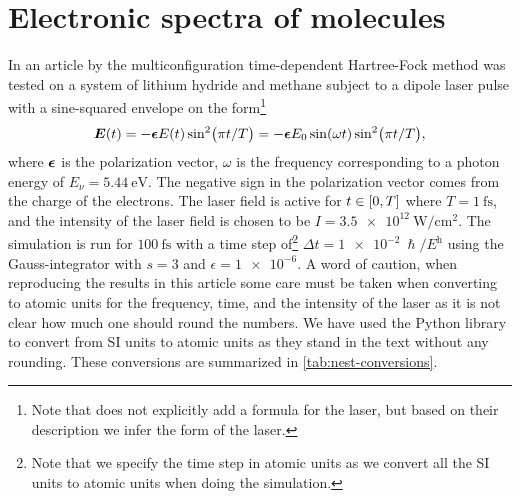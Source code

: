     \section{Electronic spectra of molecules}
        \label{sec:nest}
        In an article by \citeauthor{nest} \cite{nest} the
        multiconfiguration time-dependent Hartree-Fock method was tested on
        a system of lithium hydride and methane subject to a dipole
        laser pulse with a sine-squared envelope on the form\footnote{%
            Note that \citeauthor{nest} \cite{nest} does not explicitly add
            a formula for the laser, but based on their description we infer
            the form of the laser.
        }
        \begin{align}
            \boldsymbol{E}(t)
            = -\boldsymbol{\epsilon} E(t)
            \sin[2](\pi t / T)
            = -\boldsymbol{\epsilon} E_0 \sin(\omega t)
            \sin[2](\pi t / T),
            \label{eq:nest-laser}
        \end{align}
        where $\boldsymbol{\epsilon}$ is the polarization vector, $\omega$ is the
        frequency corresponding to a photon energy of $E_{\nu} =
        \SI{5.44}{\electronvolt}$.
        The negative sign in the polarization vector comes from the charge of
        the electrons.
        The laser field is active for $t \in \left[ 0, T \right]$ where $T =
        \SI{1}{\femto\second}$, and the intensity of the laser field is chosen
        to be $I = \SI{3.5e12}{\watt/\cm^2}$.
        The simulation is run for $\SI{100}{\femto\second}$ with a time step
        of\footnote{%
            Note that we specify the time step in atomic units as we convert all
            the SI units to atomic units when doing the simulation.
        }
        $\Delta t = \SI{1e-2}{\hslash/\hartree}$ using the Gauss-integrator with
        $s = 3$ and $\epsilon = \num{1e-6}$.
        A word of caution, when reproducing the results in this article some
        care must be taken when converting to atomic units for the frequency,
        time, and the intensity of the laser as it is not clear how much one
        should round the numbers.
        We have used the Python library  \cite{pint} to
        convert from SI units to atomic units as they stand in the text
        without any rounding.
        These conversions are summarized in \autoref{tab:nest-conversions}.
